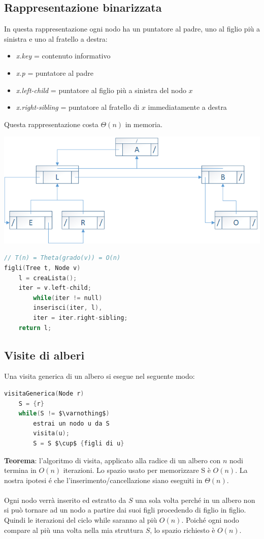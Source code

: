 \documentclass[italian]{article}
\newcommand{\varOmicron}{O}
\begin{document}
\subsection{Rappresentazione binarizzata}
In questa rappresentazione ogni nodo ha un puntatore al padre, uno al figlio più a sinistra e uno al fratello a destra:
\begin{itemize}[itemsep=0pt]
	\item \textit{x.key} = contenuto informativo
	\item \textit{x.p} = puntatore al padre
	\item \textit{x.left-child} = puntatore al figlio più a sinistra del nodo $x$
	\item \textit{x.right-sibling} = puntatore al fratello di $x$ immediatamente a destra
\end{itemize}
Questa rappresentazione costa $\varTheta(n)$ in memoria.
\begin{center}
\includegraphics[width=0.7\linewidth]{images/albero_lista_figlio_sinistro_Fratello_destro}
\end{center}
\begin{lstlisting}[language=c,mathescape=true]
// T(n) = Theta(grado(v)) = O(n)
figli(Tree t, Node v)
	l = creaLista();
	iter = v.left-child;
		while(iter != null)
		inserisci(iter, l),
		iter = iter.right-sibling;
	return l;
\end{lstlisting}
\pagebreak
\subsection{Visite di alberi}
Una visita generica di un albero si esegue nel seguente modo:
\begin{lstlisting}[language=c,mathescape=true]
visitaGenerica(Node r)
	S = {r}
	while(S != $\varnothing$)
		estrai un nodo u da S
		visita(u);
		S = S $\cup$ {figli di u}
\end{lstlisting}
\textbf{Teorema}: l’algoritmo di visita, applicato alla radice di un albero con $n$ nodi termina in $\varOmicron(n)$ iterazioni. Lo spazio usato per memorizzare S è $\varOmicron(n)$. La nostra ipotesi é che l'inserimento/cancellazione siano eseguiti in $\varTheta(n)$. \\\\
Ogni nodo verrà inserito ed estratto da $S$ una sola volta perché in un albero non si può tornare ad un nodo a partire dai suoi figli procedendo di figlio in figlio. Quindi le iterazioni del ciclo while saranno al più $\varOmicron(n)$. Poiché ogni nodo compare al più una volta nella mia struttura $S$, lo spazio richiesto è $\varOmicron(n)$.
\end{document}
